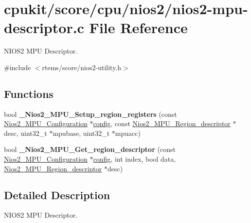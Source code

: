\hypertarget{nios2-mpu-descriptor_8c}{}\section{cpukit/score/cpu/nios2/nios2-\/mpu-\/descriptor.c File Reference}
\label{nios2-mpu-descriptor_8c}


N\+I\+O\+S2 M\+PU Descriptor.  


{\ttfamily \#include $<$rtems/score/nios2-\/utility.\+h$>$}\newline
\subsection*{Functions}
\begin{DoxyCompactItemize}
\item 
\mbox{\label{nios2-mpu-descriptor_8c_af8391168bbb1d5a3cc446143fbd7bf4c}} 
bool {\bfseries \+\_\+\+Nios2\+\_\+\+M\+P\+U\+\_\+\+Setup\+\_\+region\+\_\+registers} (const \mbox{\hyperlink{structNios2__MPU__Configuration}{Nios2\+\_\+\+M\+P\+U\+\_\+\+Configuration}} $\ast$\mbox{\hyperlink{structconfig__s}{config}}, const \mbox{\hyperlink{structNios2__MPU__Region__descriptor}{Nios2\+\_\+\+M\+P\+U\+\_\+\+Region\+\_\+descriptor}} $\ast$desc, uint32\+\_\+t $\ast$mpubase, uint32\+\_\+t $\ast$mpuacc)
\item 
\mbox{\label{nios2-mpu-descriptor_8c_a9cd892bdd8fd90a8acbe14cab3c664c0}} 
bool {\bfseries \+\_\+\+Nios2\+\_\+\+M\+P\+U\+\_\+\+Get\+\_\+region\+\_\+descriptor} (const \mbox{\hyperlink{structNios2__MPU__Configuration}{Nios2\+\_\+\+M\+P\+U\+\_\+\+Configuration}} $\ast$\mbox{\hyperlink{structconfig__s}{config}}, int index, bool data, \mbox{\hyperlink{structNios2__MPU__Region__descriptor}{Nios2\+\_\+\+M\+P\+U\+\_\+\+Region\+\_\+descriptor}} $\ast$desc)
\end{DoxyCompactItemize}


\subsection{Detailed Description}
N\+I\+O\+S2 M\+PU Descriptor. 

